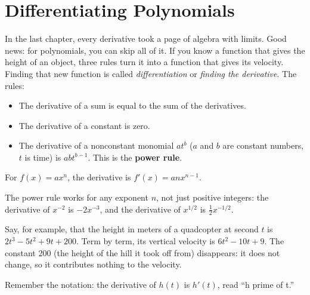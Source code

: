 \chapter{Differentiating Polynomials}

In the last chapter, every derivative took a page of algebra with limits.
Good news: for polynomials, you can skip all of it. If you know a
function that gives the height of an object, three rules turn it into a
function that gives its velocity. Finding that new function is called
\emph{differentiation} or \emph{finding the derivative}.
The rules:
\begin{itemize}
\item The derivative of a sum is equal to the sum of the derivatives.
\item The derivative of a constant is zero.
\item The derivative of a nonconstant monomial $at^b$ ($a$ and $b$ are constant numbers, $t$ is time) is $abt^{b-1}$. This is the \textbf{power rule}. 
\end{itemize}

\begin{mdframed}[frametitle = {Power Rule}, style = important]
For \( f(x) = ax^n \), the derivative is \( f'(x) = anx^{n-1} \).
\end{mdframed}

The power rule works for any exponent $n$, not just positive integers:
the derivative of $x^{-2}$ is $-2x^{-3}$, and the derivative of $x^{1/2}$
is $\frac{1}{2}x^{-1/2}$.

Say, for example, that the height in meters of a quadcopter at second $t$
is $2t^3 - 5t^2 + 9t + 200$. Term by term, its vertical velocity is
$6t^{2} - 10t + 9$. The constant 200 (the height of the hill it took off
from) disappears: it does not change, so it contributes nothing to the
velocity.

Remember the notation: the derivative of $h(t)$ is $h'(t)$, read ``h prime of t.'' 

